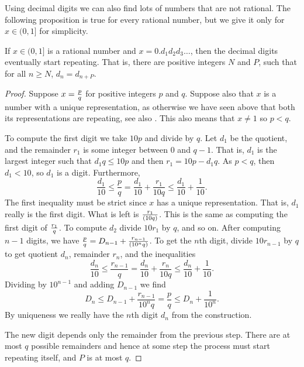 Using decimal digits we can also find lots of numbers that are not rational.
The following proposition is true for every
rational number, but we give it only for $x \in (0,1]$ for simplicity.

\begin{prop} \label{prop:rationaldecimal}
If $x \in (0,1]$ is a rational number and $x = 0.d_1d_2d_3\ldots$,
then the decimal digits eventually start repeating.  That is, there are 
positive integers $N$ and $P$, such that for all $n \geq N$, $d_n = d_{n+P}$.
\end{prop}

\begin{proof}
Suppose $x = \nicefrac{p}{q}$ for positive integers $p$ and $q$.
Suppose also that $x$ is a number with a unique representation, as
otherwise we have seen above that both its representations are repeating,
see also .  This also means
that $x \not= 1$ so $p < q$.

To compute the first digit we take $10 p$ and divide by
$q$.  Let $d_1$ be the quotient, and the remainder $r_1$ is some integer
between 0 and $q-1$.  That is, $d_1$ is the largest integer
such that $d_1 q \leq 10p$ and then $r_1 = 10p - d_1q$.
As $p < q$, then $d_1 < 10$, so $d_1$ is a digit.
Furthermore,
\begin{equation*}
\frac{d_1}{10} \leq \frac{p}{q} =
\frac{d_1}{10} + \frac{r_1}{10q} \leq \frac{d_1}{10} +
\frac{1}{10} .
\end{equation*}
The first inequality must be strict since $x$ has a
unique representation.  That is, $d_1$ really is the first digit.
What is left is $\nicefrac{r_1}{(10q)}$.  This is the same as computing the
first digit of $\nicefrac{r_1}{q}$.
To compute $d_2$ divide $10 r_1$ by $q$, and so on.
After computing $n-1$ digits, we have
$\nicefrac{p}{q} = D_{n-1} + \nicefrac{r_{n-1}}{(10^{n} q)}$.
To get the $n$th digit,
divide $10 r_{n-1}$ by $q$
to get quotient $d_n$, remainder $r_n$, and the inequalities
\begin{equation*}
\frac{d_n}{10} \leq \frac{r_{n-1}}{q} =
\frac{d_n}{10} + \frac{r_n}{10q} \leq \frac{d_n}{10} +
\frac{1}{10} .
\end{equation*}
Dividing by $10^{n-1}$ and adding $D_{n-1}$ we find
\begin{equation*}
D_n \leq D_{n-1} + \frac{r_{n-1}}{10^{n} q} = \frac{p}{q} \leq D_n +
\frac{1}{10^n} .
\end{equation*}
By uniqueness we really have 
the $n$th digit $d_n$ from the construction.

The new digit depends only the remainder from the previous
step.  There
are at most $q$ possible remainders
and hence at some step the process must start repeating itself,
and $P$ is at most $q$.
\end{proof}

